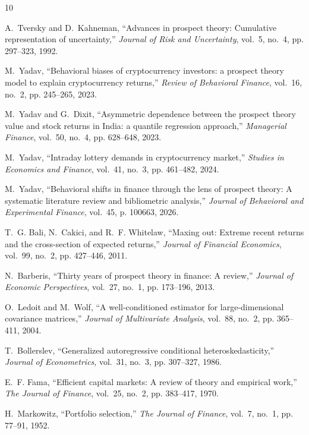\documentclass[10pt,journal,compsoc]{IEEEtran}
\begin{document}
\begin{thebibliography}{10}

A.~Tversky and D.~Kahneman, ``Advances in prospect theory: Cumulative representation of uncertainty,'' \emph{Journal of Risk and Uncertainty}, vol.~5, no.~4, pp. 297--323, 1992.

M.~Yadav, ``Behavioral biases of cryptocurrency investors: a prospect theory model to explain cryptocurrency returns,'' \emph{Review of Behavioral Finance}, vol.~16, no.~2, pp. 245--265, 2023.

M.~Yadav and G.~Dixit, ``Asymmetric dependence between the prospect theory value and stock returns in India: a quantile regression approach,'' \emph{Managerial Finance}, vol.~50, no.~4, pp. 628--648, 2023.

M.~Yadav, ``Intraday lottery demands in cryptocurrency market,'' \emph{Studies in Economics and Finance}, vol.~41, no.~3, pp. 461--482, 2024.

M.~Yadav, ``Behavioral shifts in finance through the lens of prospect theory: A systematic literature review and bibliometric analysis,'' \emph{Journal of Behavioral and Experimental Finance}, vol.~45, p. 100663, 2026.

T.~G. Bali, N.~Cakici, and R.~F. Whitelaw, ``Maxing out: Extreme recent returns and the cross-section of expected returns,'' \emph{Journal of Financial Economics}, vol.~99, no.~2, pp. 427--446, 2011.

N.~Barberis, ``Thirty years of prospect theory in finance: A review,'' \emph{Journal of Economic Perspectives}, vol.~27, no.~1, pp. 173--196, 2013.

O.~Ledoit and M.~Wolf, ``A well-conditioned estimator for large-dimensional covariance matrices,'' \emph{Journal of Multivariate Analysis}, vol.~88, no.~2, pp. 365--411, 2004.

T.~Bollerslev, ``Generalized autoregressive conditional heteroskedasticity,'' \emph{Journal of Econometrics}, vol.~31, no.~3, pp. 307--327, 1986.

E.~F. Fama, ``Efficient capital markets: A review of theory and empirical work,'' \emph{The Journal of Finance}, vol.~25, no.~2, pp. 383--417, 1970.

H.~Markowitz, ``Portfolio selection,'' \emph{The Journal of Finance}, vol.~7, no.~1, pp. 77--91, 1952.

\end{thebibliography}
\end{document}
